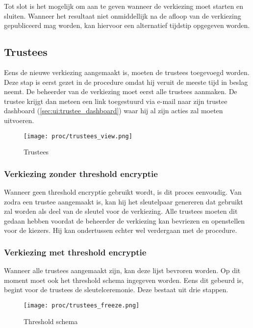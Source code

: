 \npar Tot slot is het mogelijk om aan te geven wanneer de verkiezing moet starten en sluiten. Wanneer het resultaat niet onmiddellijk na de afloop van de verkiezing gepubliceerd mag worden, kan hiervoor een alternatief tijdstip opgegeven worden.

\subsection{Trustees}
\label{sec:proc:trustees}

Eens de nieuwe verkiezing aangemaakt is, moeten de trustees toegevoegd worden. Deze stap is eerst gezet in de procedure omdat hij veruit de meeste tijd in beslag neemt. De beheerder van de verkiezing moet eerst alle trustees aanmaken. De trustee krijgt dan meteen een link toegestuurd via e-mail naar zijn trustee dashboard (\ref{sec:ui:trustee_dashboard}) waar hij al zijn acties zal moeten uitvoeren.

\begin{figure}
  \centering
  \texttt{[image: proc/trustees\_view.png]}
  \caption{Trustees}
  \label{fig:proc:trustees_view}
\end{figure}

\subsubsection{Verkiezing zonder threshold encryptie}

Wanneer geen threshold encryptie gebruikt wordt, is dit proces eenvoudig. Van zodra een trustee aangemaakt is, kan hij het sleutelpaar genereren dat gebruikt zal worden als deel van de sleutel voor de verkiezing. Alle trustees moeten dit gedaan hebben voordat de beheerder de verkiezing kan bevriezen en openstellen voor de kiezers. Hij kan ondertussen echter wel verdergaan met de procedure.

\subsubsection{Verkiezing met threshold encryptie}

\npar Wanneer alle trustees aangemaakt zijn, kan deze lijst bevroren worden. Op dit moment moet ook het threshold schema ingegeven worden. Eens dit gebeurd is, begint voor de trustees de sleutelceremonie. Deze bestaat uit drie stappen.

\begin{figure}
  \centering
  \texttt{[image: proc/trustees\_freeze.png]}
  \caption{Threshold schema}
  \label{fig:proc:trustees_freeze}
\end{figure}

